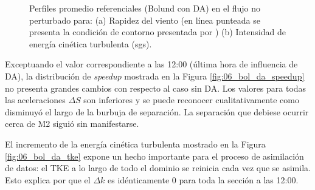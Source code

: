 \begin{figure}[H]
	\caption{Perfiles promedio referenciales (Bolund con DA) en el flujo no perturbado para: (a) Rapidez del viento (en línea punteada se presenta la condición de contorno presentada por \cite{Bechmann2011}) (b) Intensidad de energía cinética turbulenta (sgs).}
	\label{fig:06_bol_da_referencia}
\end{figure}

Exceptuando el valor correspondiente a las 12:00 (última hora de influencia de DA), la distribución de \emph{speedup} mostrada en la Figura \ref{fig:06_bol_da_speedup} no presenta grandes cambios con respecto al caso sin DA. Los valores para todas las aceleraciones $\Delta S$ son inferiores y se puede reconocer cualitativamente como disminuyó el largo de la burbuja de separación. La separación que debiese ocurrir cerca de M2 siguió sin manifestarse.

El incremento de la energía cinética turbulenta mostrado en la Figura \ref{fig:06_bol_da_tke} expone un hecho importante para el proceso de asimilación de datos: el TKE a lo largo de todo el dominio se reinicia cada vez que se asimila. Esto explica por que el $\Delta k$ es idénticamente 0 para toda la sección a las 12:00. 

